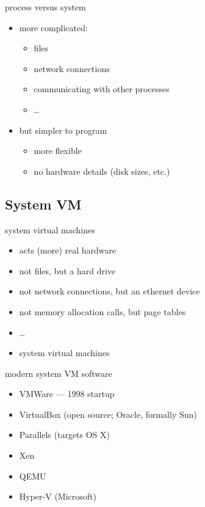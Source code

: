 \begin{frame}{process versus system}
    \begin{itemize}
    \item more complicated:
        \begin{itemize}
        \item files
        \item network connections
        \item communicating with other processes
        \item \ldots
        \end{itemize}
    \item but simpler to program
        \begin{itemize}
        \item more flexible
        \item no hardware details (disk sizes, etc.)
        \end{itemize}
    \end{itemize}
\end{frame}

\subsection{System VM}


\begin{frame}{system virtual machines}
    \begin{itemize}
    \item acts (more)  real hardware
    \item not files, but a hard drive
    \item not network connections, but an ethernet device
    \item not memory allocation calls, but page tables
    \item \ldots
    \item system virtual machines 
    \end{itemize}
\end{frame}

\begin{frame}{modern system VM software}
    \begin{itemize}
    \item VMWare --- 1998 startup
    \item VirtualBox (open source; Oracle, formally Sun)
    \item Parallels (targets OS X)
    \item Xen
    \item QEMU
    \item Hyper-V (Microsoft)
    \end{itemize}
\end{frame}


